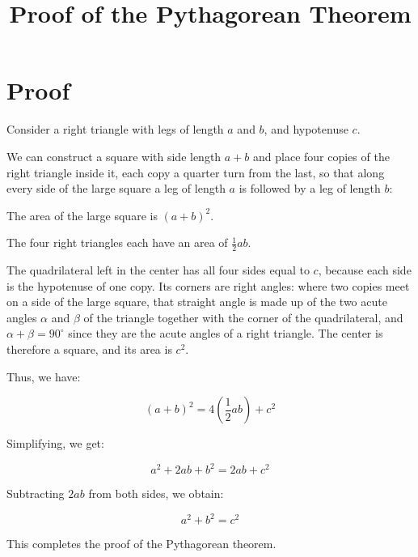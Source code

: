 \documentclass{article}
\begin{document}
\title{Proof of the Pythagorean Theorem}
\author{}
\date{}
\maketitle

\section*{Proof}

Consider a right triangle with legs of length \(a\) and \(b\), and hypotenuse \(c\).

We can construct a square with side length \(a + b\) and place four copies of the
right triangle inside it, each copy a quarter turn from the last, so that along
every side of the large square a leg of length \(a\) is followed by a leg of
length \(b\):

\begin{center}
\end{center}

The area of the large square is \((a + b)^2\).

The four right triangles each have an area of \(\frac{1}{2}ab\).

The quadrilateral left in the center has all four sides equal to \(c\), because
each side is the hypotenuse of one copy. Its corners are right angles: where two
copies meet on a side of the large square, that straight angle is made up of the
two acute angles \(\alpha\) and \(\beta\) of the triangle together with the
corner of the quadrilateral, and \(\alpha + \beta = 90^\circ\) since they are the
acute angles of a right triangle. The center is therefore a square, and its area
is \(c^2\).

Thus, we have:

\[
(a + b)^2 = 4 \left( \frac{1}{2} ab \right) + c^2
\]

Simplifying, we get:

\[
a^2 + 2ab + b^2 = 2ab + c^2
\]

Subtracting \(2ab\) from both sides, we obtain:

\[
a^2 + b^2 = c^2
\]

This completes the proof of the Pythagorean theorem.
\end{document}
